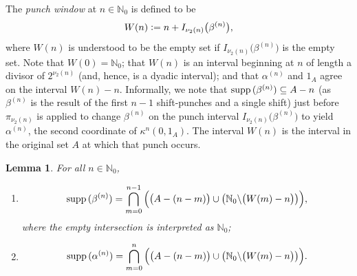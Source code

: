 \documentclass[letter,11pt]{article}
\theoremstyle{plain}
\newtheorem{lemma}[theorem]{Lemma}
\theoremstyle{definition}
\theoremstyle{plain}
\theoremstyle{plain}
\numberwithin{equation}{section}
\newcommand{\supp}{{\normalfont\text{supp}}\,}
\newcommand{\N}{\mathbb{N}}
\newcommand{\defeq}{\vcentcolon=}
\renewcommand{\setminus}{\backslash}
\newcommand{\bpunch}{\beta}
\newcommand{\apunch}{\alpha}
\begin{document}
The \emph{punch window} at $n \in \N_0$ is defined to be
\[W(n) \defeq n + I_{\nu_2(n)}\big( \bpunch^{(n)} \big),\]
where $W(n)$ is understood to be the empty set if $I_{\nu_2(n)}\big( \bpunch^{(n)} \big)$ is the empty set.  Note that $W(0) = \N_0$; that $W(n)$ is an interval beginning at $n$ of length a divisor of $2^{\nu_2(n)}$ (and, hence, is a dyadic interval); and that $\apunch^{(n)}$ and $1_A$ agree on the interval $W(n) - n$.  Informally, we note that $\supp(\bpunch^{(n)}) \subseteq A-n$ (as $\bpunch^{(n)}$ is the result of the first $n-1$ shift-punches and a single shift) just before $\pi_{\nu_2(n)}$ is applied to change $\bpunch^{(n)}$ on the punch interval $I_{\nu_2(n)}\big( \bpunch^{(n)} \big)$ to yield $\apunch^{(n)}$, the second coordinate of $\kappa^n (0,1_A)$.  The interval $W(n)$ is the interval in the original set $A$ at which that punch occurs.

\begin{lemma}
\label{lemma_explicit_description_of_omega_and_kappa}
    For all $n \in \N_0$,
    \begin{enumerate}
        \item \label{item_explicit_description_of_omega_and_kappa_one}
    \begin{align}
        \label{eqn_set_indicated_by_omega_n}
        \supp(\bpunch^{(n)}) = \bigcap_{m=0}^{n-1} \Big( \big( A - (n-m) \big) \cup \big( \N_0 \setminus \big( W(m)-n \big) \big) \Big),
    \end{align}
        where the empty intersection is interpreted as $\N_0$;

        \item \label{item_explicit_description_of_omega_and_kappa_two}
    \begin{align}
        \label{eqn_set_indicated_by_kappa_n}
        \supp(\apunch^{(n)}) = \bigcap_{m=0}^{n} \Big( \big( A - (n-m) \big) \cup \big( \N_0 \setminus \big( W(m)-n \big) \big) \Big).
    \end{align}
    \end{enumerate}
\end{lemma}
\end{document}
